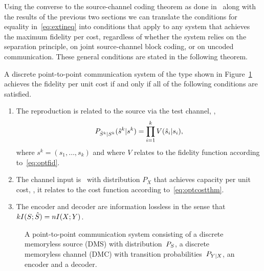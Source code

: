 Using the converse to the source-channel coding theorem as done
in~\cite{GastparThesis} along with the results of the previous two
sections we
can translate the conditions for equality in~\eqref{eq:extineq} into conditions
that apply to any system that achieves the maximum fidelity per cost, regardless
of whether the system relies on the separation principle, on joint
source-channel block coding, or on uncoded communication.  These general
conditions are stated in the following theorem.


\begin{theorem}
  \label{thm:bla}
  A discrete point-to-point communication system of the type shown in
  Figure~\ref{fig:scmodel} achieves the fidelity per unit cost if and only if
  all of the following conditions are satisfied.

\begin{enumerate}
  \item The reproduction is related to the source via the test channel, \ie,
    \[P_{{\hat{S}}^k|S^k}({\hat{s}}^k|s^k)=\prod_{i=1}^k
    V({\hat{s}}_i|s_i), \]
    where $s^k =(s_1, \ldots, s_k)$     and where $V$ relates to the fidelity
    function according to~\eqref{eq:optfid}.
  \item The channel input is \iid\ with distribution $P_X$ that achieves
    capacity per unit cost, \ie, it relates to the cost function according
    to~\eqref{eq:optcostthm}.
  \item The encoder and decoder are information lossless in the sense that
    $kI(S;{\hat{S}}) = n I(X;Y)$.  
\end{enumerate}
\end{theorem}

\begin{figure}
  \begin{center}

  \end{center}
  \caption{A point-to-point communication system consisting of a discrete
  memoryless source (DMS) with distribution~${P_S}$, a discrete memoryless channel
  (DMC) with transition probabilities~$P_{Y|X}$, an encoder and a decoder.}
  \label{fig:scmodel}
\end{figure}

